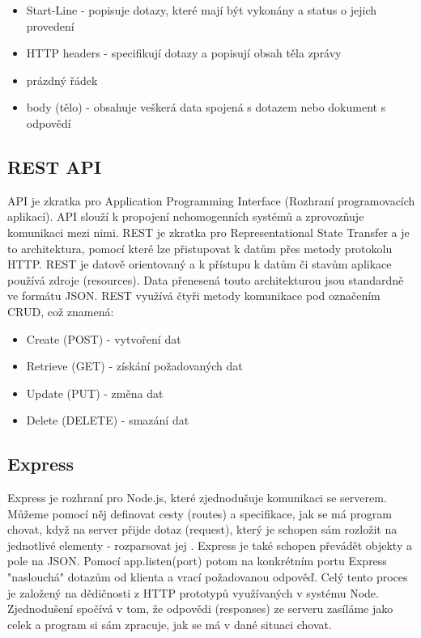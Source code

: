 \begin{itemize}
\item Start-Line - popisuje dotazy, které mají být vykonány a status o jejich provedení
\item HTTP headers - specifikují dotazy a popisují obsah těla zprávy
\item prázdný řádek
\item body (tělo) - obsahuje veškerá data spojená s dotazem nebo dokument s odpovědí
\end{itemize}

\subsection {REST API}
API je zkratka pro Application Programming Interface (Rozhraní programovacích aplikací). API slouží k propojení nehomogenních systémů a zprovozňuje komunikaci mezi nimi. REST je zkratka pro Representational State Transfer a je to architektura, pomocí které lze přistupovat k datům přes metody protokolu HTTP. REST je datově orientovaný a k přístupu k datům či stavům aplikace používá zdroje (resources). Data přenesená touto architekturou jsou standardně ve formátu JSON.\cite{API} \cite{zdrojak} REST využívá čtyři metody komunikace pod označením CRUD, což znamená:

\begin{itemize}
\item Create (POST) - vytvoření dat
\item Retrieve (GET) - získání požadovaných dat
\item Update (PUT) - změna dat
\item Delete (DELETE) - smazání dat
\end{itemize}

\subsection{Express}
Express je rozhraní pro Node.js, které zjednodušuje komunikaci se serverem. Můžeme pomocí něj definovat cesty (routes) a specifikace, jak se má program chovat, když na server přijde dotaz (request), který je schopen sám rozložit na jednotlivé elementy - rozparsovat jej . Express je také schopen převádět objekty a pole na JSON. Pomocí app.listen(port) potom na konkrétním portu Express "naslouchá" dotazům od klienta a vrací požadovanou odpověď. Celý tento proces je založený na dědičnosti z HTTP prototypů využívaných v systému Node. Zjednodušení spočívá v tom, že odpovědi (responses) ze serveru zasíláme jako celek a program si sám zpracuje, jak se má v dané situaci chovat. \cite{MERN Stack}

